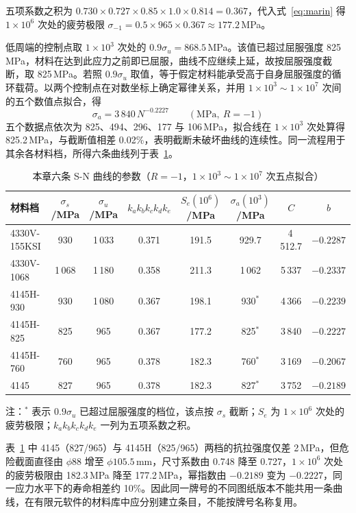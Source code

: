 五项系数之积为 $0.730\times0.727\times0.85\times1.0\times0.814=0.367$，代入式~\eqref{eq:marin} 得 $1\times10^{6}$ 次处的疲劳极限 $\sigma_{-1}=0.5\times965\times0.367\approx177.2$\,MPa。

低周端的控制点取 $1\times10^{3}$ 次处的 $0.9\sigma_u=868.5$\,MPa。该值已超过屈服强度 825\,MPa，材料在达到此应力之前即已屈服，曲线不应继续上延，故按屈服强度截断，取 825\,MPa。若照 $0.9\sigma_u$ 取值，等于假定材料能承受高于自身屈服强度的循环载荷。以两个控制点在对数坐标上确定幂律关系，并用 $1\times10^{3}\sim1\times10^{7}$ 次间的五个数值点拟合，得
\begin{equation}
\sigma_a=3\,840\,N^{-0.2227}\qquad(\mathrm{MPa},\ R=-1)
\label{eq:sn-825}
\end{equation}
五个数据点依次为 825、494、296、177 与 106\,MPa，拟合线在 $1\times10^{3}$ 次处算得 825.2\,MPa，与截断值相差 0.02\%，表明截断未破坏曲线的连续性。同一流程用于其余各材料档，所得六条曲线列于表~\ref{tab:sn-params}。

\begin{table}[htbp]
\centering
\caption{本章六条 S-N 曲线的参数（$R=-1$，$1\times10^{3}\sim1\times10^{7}$ 次五点拟合）}
\label{tab:sn-params}
\small
\setlength{\tabcolsep}{4pt}
\begin{tabular}{@{}lccccccc@{}}
\hline
材料档 & $\sigma_s$/MPa & $\sigma_u$/MPa & $k_a k_b k_c k_d k_e$ & $S_e(10^{6})$/MPa & $\sigma_a(10^{3})$/MPa & $C$ & $b$ \\
\hline
4330V-155KSI & 930 & 1\,033 & 0.371 & 191.5 & 929.7 & 4\,512.7 & $-0.2287$ \\
4330V-1068 & 1\,068 & 1\,180 & 0.358 & 211.3 & 1\,062 & 5\,337 & $-0.2337$ \\
4145H-930 & 930 & 1\,080 & 0.367 & 198.1 & 930$^{*}$ & 4\,366 & $-0.2239$ \\
4145H-825 & 825 & 965 & 0.367 & 177.2 & 825$^{*}$ & 3\,840 & $-0.2227$ \\
4145H-760 & 760 & 965 & 0.378 & 182.3 & 760$^{*}$ & 3\,169 & $-0.2067$ \\
4145 & 827 & 965 & 0.378 & 182.3 & 827$^{*}$ & 3\,752 & $-0.2189$ \\
\hline
\end{tabular}

\vspace{2pt}
{\footnotesize 注：$^{*}$ 表示 $0.9\sigma_u$ 已超过屈服强度的档位，该点按 $\sigma_s$ 截断；$S_e$ 为 $1\times10^{6}$ 次处的疲劳极限；$k_a k_b k_c k_d k_e$ 一列为五项系数之积。}
\end{table}

表~\ref{tab:sn-params} 中 4145（827/965）与 4145H（825/965）两档的抗拉强度仅差 2\,MPa，但危险截面直径由 $\phi88$ 增至 $\phi105.5$\,mm，尺寸系数由 0.748 降至 0.727，$1\times10^{6}$ 次处的疲劳极限由 182.3\,MPa 降至 177.2\,MPa，幂指数由 $-0.2189$ 变为 $-0.2227$，同一应力水平下的寿命相差约 10\%。因此同一牌号的不同图纸版本不能共用一条曲线，在有限元软件的材料库中应分别建立条目，不能按牌号名称复用。

